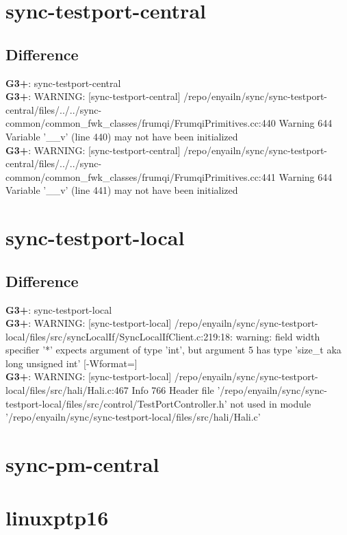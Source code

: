 \documentclass[12pt,twoside]{article}
\begin{document}
\section{sync-testport-central} 
\subsection{Difference} 
  
\textbf{G3+}: sync-testport-central\\ 
\textbf{G3+}: WARNING: [sync-testport-central] /repo/enyailn/sync/sync-testport-central/files/../../sync-common/common\_fwk\_classes/frumqi/FrumqiPrimitives.cc:440 Warning 644 Variable '\_\_v' (line 440) may not have been initialized\\ 
\textbf{G3+}: WARNING: [sync-testport-central] /repo/enyailn/sync/sync-testport-central/files/../../sync-common/common\_fwk\_classes/frumqi/FrumqiPrimitives.cc:441 Warning 644 Variable '\_\_v' (line 441) may not have been initialized\\ 
  
\section{sync-testport-local} 
\subsection{Difference} 
  
\textbf{G3+}: sync-testport-local\\ 
\textbf{G3+}: WARNING: [sync-testport-local] /repo/enyailn/sync/sync-testport-local/files/src/syncLocalIf/SyncLocalIfClient.c:219:18: warning: field width specifier '*' expects argument of type 'int', but argument 5 has type 'size\_t {aka long unsigned int}' [-Wformat=]\\ 
\textbf{G3+}: WARNING: [sync-testport-local] /repo/enyailn/sync/sync-testport-local/files/src/hali/Hali.c:467 Info 766 Header file '/repo/enyailn/sync/sync-testport-local/files/src/control/TestPortController.h' not used in module '/repo/enyailn/sync/sync-testport-local/files/src/hali/Hali.c'\\ 
  
\section{sync-pm-central} 
  
\section{linuxptp16} 
  
\end{document}
